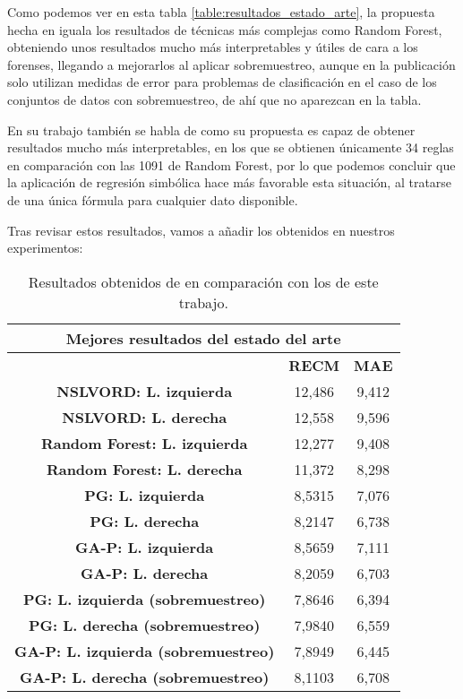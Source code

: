 Como podemos ver en esta tabla \ref{table:resultados_estado_arte}, la propuesta hecha en \cite{NSLVOrdAge} iguala los resultados de técnicas más complejas como Random Forest, obteniendo unos resultados mucho más interpretables y útiles de cara a los forenses, llegando a mejorarlos al aplicar sobremuestreo, aunque en la publicación solo utilizan medidas de error para problemas de clasificación en el caso de los conjuntos de datos con sobremuestreo, de ahí que no aparezcan en la tabla.

En su trabajo también se habla de como su propuesta es capaz de obtener resultados mucho más interpretables, en los que se obtienen únicamente 34 reglas en comparación con las 1091 de Random Forest, por lo que podemos concluir que la aplicación de regresión simbólica hace más favorable esta situación, al tratarse de una única fórmula para cualquier dato disponible.

Tras revisar estos resultados, vamos a añadir los obtenidos en nuestros experimentos:

\begin{table}[H]
\centering
\begin{tabular}{|c|c|c|}
\hline
\multicolumn{3}{|c|}{\textbf{Mejores resultados del estado del arte}}        \\ \hline
\textbf{}                                     & \textbf{RECM} & \textbf{MAE} \\ \hline
\textbf{NSLVORD: L. izquierda}                & 12,486        & 9,412        \\ \hline
\textbf{NSLVORD: L. derecha}                  & 12,558        & 9,596        \\ \hline
\textbf{Random Forest: L. izquierda}          & 12,277        & 9,408        \\ \hline
\textbf{Random Forest: L. derecha}            & 11,372        & 8,298        \\ \hline
\textbf{PG: L. izquierda}                     & 8,5315        & 7,076        \\ \hline
\textbf{PG: L. derecha}                       & 8,2147        & 6,738        \\ \hline
\textbf{GA-P: L. izquierda}                   & 8,5659        & 7,111        \\ \hline
\textbf{GA-P: L. derecha}                     & 8,2059        & 6,703        \\ \hline
\textbf{PG: L. izquierda (sobremuestreo)}     & 7,8646        & 6,394        \\ \hline
\textbf{PG: L. derecha (sobremuestreo)}       & 7,9840        & 6,559        \\ \hline
\textbf{GA-P: L. izquierda (sobremuestreo)}   & 7,8949        & 6,445        \\ \hline
\textbf{GA-P: L. derecha (sobremuestreo)}     & 8,1103        & 6,708        \\ \hline
\end{tabular}%
\caption{Resultados obtenidos de \cite{NSLVOrdAge} en comparación con los de este trabajo.}\label{table:cmp_estado_arte}
\end{table}

